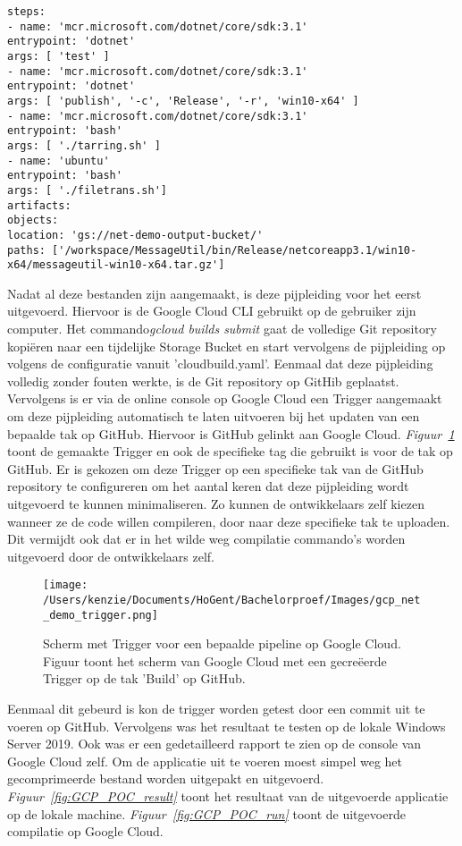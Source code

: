 \begin{lstlisting}
steps:
- name: 'mcr.microsoft.com/dotnet/core/sdk:3.1'
entrypoint: 'dotnet'
args: [ 'test' ]
- name: 'mcr.microsoft.com/dotnet/core/sdk:3.1'
entrypoint: 'dotnet'
args: [ 'publish', '-c', 'Release', '-r', 'win10-x64' ]
- name: 'mcr.microsoft.com/dotnet/core/sdk:3.1'
entrypoint: 'bash'
args: [ './tarring.sh' ]
- name: 'ubuntu'
entrypoint: 'bash'
args: [ './filetrans.sh']
artifacts:
objects:
location: 'gs://net-demo-output-bucket/'
paths: ['/workspace/MessageUtil/bin/Release/netcoreapp3.1/win10-x64/messageutil-win10-x64.tar.gz']
\end{lstlisting}

Nadat al deze bestanden zijn aangemaakt, is deze pijpleiding voor het eerst uitgevoerd. Hiervoor is de Google Cloud CLI gebruikt op de gebruiker zijn computer. Het commando\emph{gcloud builds submit} gaat de volledige Git repository kopiëren naar een tijdelijke Storage Bucket en start vervolgens de pijpleiding op volgens de configuratie vanuit 'cloudbuild.yaml'. Eenmaal dat deze pijpleiding volledig zonder fouten werkte, is de Git repository op GitHib geplaatst. Vervolgens is er via de online console op Google Cloud een Trigger aangemaakt om deze pijpleiding automatisch te laten uitvoeren bij het updaten van een bepaalde tak op GitHub. Hiervoor is GitHub gelinkt aan Google Cloud. \emph{Figuur~\ref{fig:GCP_POC_trigger}} toont de gemaakte Trigger en ook de specifieke tag die gebruikt is voor de tak op GitHub. Er is gekozen om deze Trigger op een specifieke tak van de GitHub repository te configureren om het aantal keren dat deze pijpleiding wordt uitgevoerd te kunnen minimaliseren. Zo kunnen de ontwikkelaars zelf kiezen wanneer ze de code willen compileren, door naar deze specifieke tak te uploaden. Dit vermijdt ook dat er in het wilde weg compilatie commando’s worden uitgevoerd door de ontwikkelaars zelf.

\begin{figure}[!htbp]
    \centering
    \texttt{[image: /Users/kenzie/Documents/HoGent/Bachelorproef/Images/gcp\_net\_demo\_trigger.png]}
    \caption{Scherm met Trigger voor een bepaalde pipeline op Google Cloud. Figuur toont het scherm  van Google Cloud met een gecreëerde Trigger op de tak 'Build' op GitHub.}
    \label{fig:GCP_POC_trigger}
\end{figure}

Eenmaal dit gebeurd is kon de trigger worden getest door een commit uit te voeren op GitHub. Vervolgens was het resultaat te testen op de lokale Windows Server 2019. Ook was er een gedetailleerd rapport te zien op de console van Google Cloud zelf. Om de applicatie uit te voeren moest simpel weg het gecomprimeerde bestand worden uitgepakt en uitgevoerd. \emph{Figuur~\ref{fig:GCP_POC_result}} toont het resultaat van de uitgevoerde applicatie op de lokale machine. \emph{Figuur~\ref{fig:GCP_POC_run}} toont de uitgevoerde compilatie op Google Cloud.

